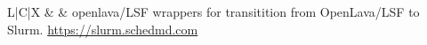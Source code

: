 \begin{tabularx}{\textwidth}{L{\firstColWidth{}}|C{\secondColWidth{}}|X}
 & 
 & 
openlava/LSF wrappers for transitition from OpenLava/LSF to Slurm.  { \color{logoblue} \url{https://slurm.schedmd.com}} 
\\ \hline 

\bottomrule
\end{tabularx}
